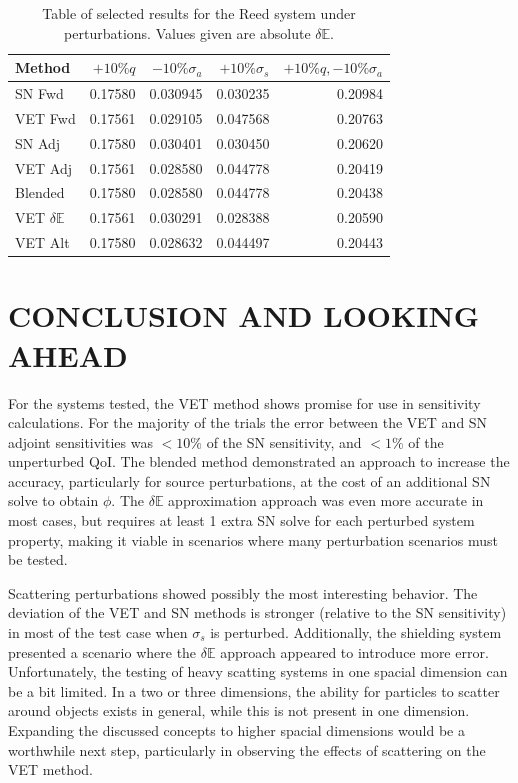 \documentclass[12pt]{report}
\newcommand{\Edd}{\mathbb{E}}
\newcommand{\sigs}{\sigma_s}
\newcommand{\siga}{\sigma_a}
\begin{document}
\begin{table}[H]
\centering
  \begin{tabular}{| l | r | r | r | r |}
    \hline
    Method  &  $+10\% q $  & $-10\% \siga $ & $+10\% \sigs $ & $+10\% q,-10\% \siga$ \\ \hline
     SN Fwd 			&0.17580 &0.030945 &0.030235 & 0.20984\\ \hline
     VET Fwd 			&0.17561 &0.029105 &0.047568 &0.20763\\ \hline
     SN Adj 			&0.17580 &0.030401 &0.030450 &0.20620\\ \hline
     VET Adj 			&0.17561 &0.028580 &0.044778 &0.20419\\ \hline
     Blended 			&0.17580 &0.028580 &0.044778 &0.20438\\ \hline
     VET $\delta \Edd$ 	&0.17561 &0.030291 &0.028388 &0.20590\\ \hline
     VET Alt		 	&0.17580 &0.028632 &0.044497 &0.20443\\ \hline
    \end{tabular}
  \caption{Table of selected results for the Reed system under perturbations. Values given are absolute $\delta \Edd$. }
\end{table}

\chapter{\uppercase {Conclusion and looking ahead}}

For the systems tested, the VET method shows promise for use in sensitivity calculations. For the majority of the trials the error between the VET and SN adjoint sensitivities was $<10\%$ of the SN sensitivity, and $<1\%$ of the unperturbed QoI. The blended method demonstrated an approach to increase the accuracy, particularly for source perturbations, at the cost of an additional SN solve to obtain $\phi$. The $\delta \Edd$ approximation approach was even more accurate in most cases, but requires at least 1 extra SN solve for each perturbed system property, making it viable in scenarios where many perturbation scenarios must be tested. 

Scattering perturbations showed possibly the most interesting behavior. The deviation of the VET and SN methods is stronger (relative to the SN sensitivity) in most of the test case when $\sigs$ is perturbed. Additionally, the shielding system presented a scenario where the $\delta \Edd$ approach appeared to introduce more error. Unfortunately, the testing of heavy scatting systems in one spacial dimension can be a bit limited. In a two or three dimensions, the ability for particles to scatter around objects exists in general, while this is not present in one dimension. Expanding the discussed concepts to higher spacial dimensions would be a worthwhile next step, particularly in observing the effects of scattering on the VET method.
\end{document}
